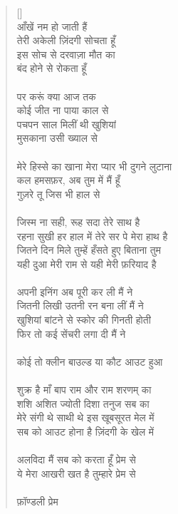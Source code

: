 \begin{verse}[\versewidth]
{\\
आँखें नम हो जाती हैं\\
तेरी अकेली ज़िंदगी सोचता हूँ\\
इस सोच से दरवाज़ा मौत का\\
बंद होने से रोकता हूँ\\
\\
पर करूं क्या आज तक\\
कोई जीत ना पाया काल से\\
पचपन साल मिलीं थी खुशियां\\
मुसकाना उसी ख्याल से\\
\\
मेरे हिस्से का खाना मेरा प्यार भी दुगने लुटाना\\
कल हमसफ़र, अब तुम में मैं हूँ\\
गुज़रे तू जिस भी हाल से\\
\\
जिस्म ना सही, रूह सदा तेरे साथ है\\
रहना सुखी हर हाल में तेरे सर पे मेरा हाथ है\\
जितने दिन मिले तुम्हें हँसते हुए बिताना तुम\\
यही दुआ मेरी राम से यही मेरी फ़रियाद है\\
\\
अपनी इनिंग अब पूरी कर ली मैं ने\\
जितनी लिखी उतनी रन बना लीं मैं ने\\
खुशियां बांटने से स्कोर की गिनती होती\\
फिर तो कई सेंचरी लगा दी मैं ने\\
\\
कोई तो क्लीन बाउल्ड या कौट आउट हुआ\\
\\
शुक्र है माँ बाप राम और राम शरणम् का\\
शशि अशित ज्योती दिशा तनुज सब का\\
मेरे संगी थे साथी थे इस खूबसूरत मेल में\\
सब को आउट होना है ज़िंदगी के खेल में\\
\\
अलविदा मैं सब को करता हूँ प्रेम से\\
ये मेरा आखरी खत है तुम्हारे प्रेम से\\
\\
फ़ॉण्डली प्रेम
}
\end{verse}

